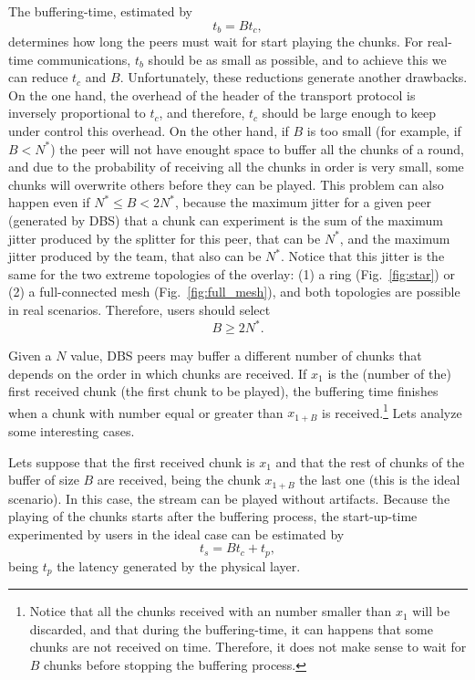 

\label{sec:buffering_time}
The buffering-time, estimated by
\begin{equation}
  \label{eq:t_b}
  t_b = Bt_c,
\end{equation}
determines how long the peers must wait for start playing the
chunks. For real-time communications, $t_b$ should be as small as
possible, and to achieve this we can reduce $t_c$ and
$B$. Unfortunately, these reductions generate another drawbacks. On
the one hand, the overhead of the header of the transport protocol is
inversely proportional to $t_c$, and therefore, $t_c$ should be large
enough to keep under control this overhead. On the other hand, if $B$
is too small (for example, if $B<N^*$) the peer will not have enought
space to buffer all the chunks of a round, and due to the probability
of receiving all the chunks in order is very small, some chunks will
overwrite others before they can be played. This problem can also
happen even if $N^*\leq B<2N^*$, because the maximum jitter for a
given peer (generated by DBS) that a chunk can experiment is the sum
of the maximum jitter produced by the splitter for this peer, that can
be $N^*$, and the maximum jitter produced by the team, that also can
be $N^*$. Notice that this jitter is the same for the two extreme
topologies of the overlay: (1) a ring (Fig.~\ref{fig:star}) or (2) a
full-connected mesh (Fig.~\ref{fig:full_mesh}), and both topologies
are possible in real scenarios. Therefore, users should select
\begin{equation}
  \label{eq:minimum_B}
  B\ge 2N^*.
\end{equation}

Given a $N$ value, DBS peers may buffer a different number of chunks
that depends on the order in which chunks are received. If $x_1$ is
the (number of the) first received chunk (the first chunk to be
played), the buffering time finishes when a chunk with number equal or
greater than $x_{1+B}$ is received.\footnote{Notice that all the
  chunks received with an number smaller than $x_1$ will be discarded,
  and that during the buffering-time, it can happens that some chunks
  are not received on time. Therefore, it does not make sense to wait
  for $B$ chunks before stopping the buffering process.} Lets analyze
some interesting cases.

Lets suppose that the first received chunk is $x_1$ and that the rest
of chunks of the buffer of size $B$ are received, being the chunk
$x_{1+B}$ the last one (this is the ideal scenario). In this case, the
stream can be played without artifacts. Because the playing of the
chunks starts after the buffering process, the start-up-time
experimented by users in the ideal case can be estimated by
\begin{equation}
  t_s=Bt_c+t_p,
  \label{eq:start-up-time}
\end{equation}
being $t_p$ the latency generated by the physical layer.

